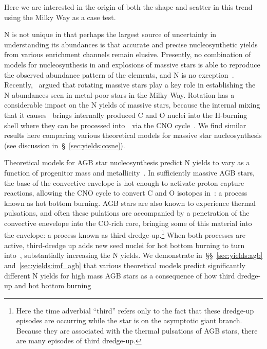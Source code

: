 \documentclass[ms.tex]{subfiles}
\begin{document}
Here we are interested in the origin of both the shape and scatter in this
trend using the Milky Way as a case test.
\par
N is not unique in that perhaps the largest source of uncertainty in
understanding its abundances is that accurate and precise nucleosynthetic yields
from various enrichment channels remain elusive.
Presently, no combination of models for nucleosynthesis in and explosions of
massive stars is able to reproduce the observed abundance pattern of the
elements, and N is no exception~\citep{Griffith2021a}.
Recently,~\citet*{Grisoni2021} argued that rotating massive stars play a key
role in establishing the N abundances seen in metal-poor stars in the Milky Way.
Rotation has a considerable impact on the N yields of massive stars, because the
internal mixing that it causes~\citep{Zahn1992, Maeder1998, Lagarde2012} brings
internally produced C and O nuclei into the H-burning shell where they can be
processed into~\Nfourteen~via the CNO cycle~\citep{Heger2010, Frischknecht2016,
Andrews2017}.
We find similar results here comparing various theoretical models for
massive star nucleosynthesis (see discussion in~\S~\ref{sec:yields:ccsne}).
\par
Theoretical models for AGB star nucleosynthesis predict N yields to vary as a
function of progenitor mass and metallicity~\citep{Cristallo2011, Cristallo2015,
Karakas2010, Karakas2016, Karakas2018, Ventura2013, Ventura2014, Ventura2018,
Ventura2020}.
In sufficiently massive AGB stars, the base of the convective envelope is hot
enough to activate proton capture reactions, allowing the CNO cycle to convert
C and O isotopes in~\Nfourteen: a process known as hot bottom burning.
AGB stars are also known to experience thermal pulsations, and often these
pulations are accompanied by a penetration of the convective enevelope into the
CO-rich core, bringing some of this material into the envelope: a process known
as third dredge-up.\footnote{
	Here the time adverbial ``third'' refers only to the fact that these
	dredge-up episodes are occurring while the star is on the asymptotic giant
	branch. Because they are associated with the thermal pulsations of AGB
	stars, there are many episodes of third dredge-up.
}
When both processes are active, third-dredge up adds new seed nuclei for hot
bottom burning to turn into~\Nfourteen, substantially increasing the N yields.
We demonstrate in~\S\S~\ref{sec:yields:agb} and~\ref{sec:yields:imf_agb} that
various theoretical models predict significantly different N yields for high
mass AGB stars as a consequence of how third dredge-up and hot bottom burning
\end{document}
